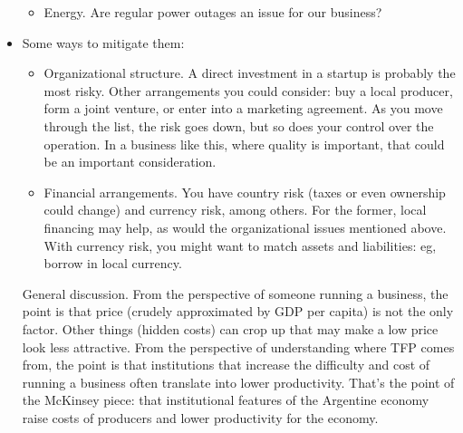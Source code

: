 \documentclass[letterpaper,12pt]{article}
\begin{document}
\begin{itemize}
\begin{itemize}
\item Energy.  Are regular power outages an issue for our business?  

\end{itemize}

\item Some ways to mitigate them:   
\begin{itemize}
\item Organizational structure.  A direct investment in a startup 
is probably the most risky.  
Other arrangements you could consider:  
buy a local producer, form a joint venture, 
or enter into a marketing agreement.  
As you move through the list, the risk goes down, 
but so does your control over the operation.  
In a business like this, where quality is important, 
that could be an important consideration.  

\item Financial arrangements.  
You have country risk (taxes or even ownership could change) 
and currency risk, among others.  
For the former, local financing may help, as would the 
organizational issues mentioned above.
With currency risk, 
you might want to match assets and liabilities:  
eg, borrow in local currency.  
\end{itemize}

General discussion.  From the perspective of someone running a business, 
the point is that price (crudely approximated by GDP per capita) 
is not the only factor.  Other things (hidden costs) can crop up that may 
make a low price look less attractive.  
From the perspective of understanding where TFP comes from, 
the point is that institutions that increase the difficulty and cost
of running a business often translate into lower productivity.
That's the point of the McKinsey piece:
that institutional features of the Argentine economy raise 
costs of producers and lower productivity for the economy.  

\end{itemize}
\end{document}
